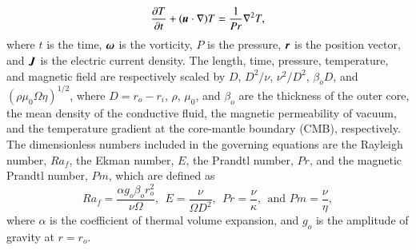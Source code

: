 %
\begin{equation}
\frac{\partial T}{\partial t} 
 + ( \mbox{\boldmath$u$} \cdot \nabla ) T =
 \frac{1}{Pr} \nabla^2 T ,
\label{eq:heat}
\end{equation}
%
where $t$ is the time, $\mbox{\boldmath$\omega$}$ is the vorticity, $P$ is the pressure, $\mbox{\boldmath$r$}$ is the position vector, and $\mbox{\boldmath$J$}$ is the electric current density.
The length, time, pressure, temperature, and magnetic field are respectively scaled by $D$, $D^2/\nu$, $\nu^2 /D^2$, $\beta_o D$, and $(\rho \mu_0 \Omega \eta )^{1/2}$,
where $D = r_o - r_i$, $\rho$, $\mu_0$, and $\beta_o$ are the thickness of the outer core, the mean density of the conductive fluid, the magnetic permeability of vacuum, and the temperature gradient at the core-mantle boundary (CMB), respectively.
The dimensionless numbers included in the governing equations are the Rayleigh number, $Ra_f$, the Ekman number, $E$, the Prandtl number, $Pr$, and the magnetic Prandtl number, $Pm$, which are defined as
%
\begin{equation}
Ra_f = \frac{\alpha g_o \beta_o r_{o}^{2}}{\nu \Omega},~~
E = \frac{\nu}{\Omega D^2},~~
Pr = \frac{\nu}{\kappa},~~ \mbox{and \ }
Pm = \frac{\nu}{\eta},
\label{eq:dimensionless_numbers}
\end{equation}
%
where $\alpha$ is the coefficient of thermal volume expansion, and $g_o$ is the amplitude of gravity at $r = r_o$.

